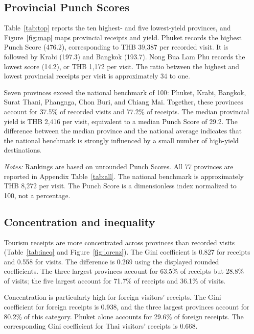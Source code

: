 \documentclass[11pt,a4paper]{article}
\begin{document}
\subsection{Provincial Punch Scores}
Table~\ref{tab:top} reports the ten highest- and five lowest-yield provinces, and Figure~\ref{fig:map} maps provincial receipts and yield. Phuket records the highest Punch Score (476.2), corresponding to THB 39,387 per recorded visit. It is followed by Krabi (197.3) and Bangkok (193.7). Nong Bua Lam Phu records the lowest score (14.2), or THB 1,172 per visit. The ratio between the highest and lowest provincial receipts per visit is approximately 34 to one.

Seven provinces exceed the national benchmark of 100: Phuket, Krabi, Bangkok, Surat Thani, Phangnga, Chon Buri, and Chiang Mai. Together, these provinces account for 37.5\% of recorded visits and 77.2\% of receipts. The median provincial yield is THB 2,416 per visit, equivalent to a median Punch Score of 29.2. The difference between the median province and the national average indicates that the national benchmark is strongly influenced by a small number of high-yield destinations.

\begin{table}[t]\centering\scriptsize
\caption{Ten highest and five lowest provincial Punch Scores, 2024}\label{tab:top}
\resizebox{\textwidth}{!}{}\par\smallskip
\parbox{\textwidth}{\scriptsize\emph{Notes:} Rankings are based on unrounded Punch Scores. All 77 provinces are reported in Appendix Table~\ref{tab:all}. The national benchmark is approximately THB 8,272 per visit. The Punch Score is a dimensionless index normalized to 100, not a percentage.}
\end{table}

\subsection{Concentration and inequality}
Tourism receipts are more concentrated across provinces than recorded visits (Table~\ref{tab:ineq} and Figure~\ref{fig:lorenz}). The Gini coefficient is 0.827 for receipts and 0.558 for visits. The difference is 0.269 using the displayed rounded coefficients. The three largest provinces account for 63.5\% of receipts but 28.8\% of visits; the five largest account for 71.7\% of receipts and 36.1\% of visits.

Concentration is particularly high for foreign visitors' receipts. The Gini coefficient for foreign receipts is 0.938, and the three largest provinces account for 80.2\% of this category. Phuket alone accounts for 29.6\% of foreign receipts. The corresponding Gini coefficient for Thai visitors' receipts is 0.668.
\end{document}
